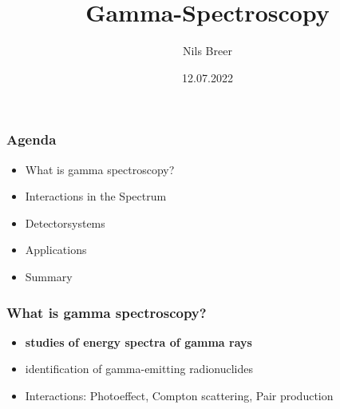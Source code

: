 \documentclass[aspectratio=1610, 12pt]{beamer}
\title{Gamma-Spectroscopy}
\author[N.Breer]{Nils Breer}
\institute{Fakultät Physik}
\date{12.07.2022}
\begin{document}
\maketitle

\begin{frame}\frametitle{Agenda}
  \begin{itemize}
    \item What is gamma spectroscopy?
    \item Interactions in the Spectrum
    \item Detectorsystems
    \item Applications
    \item Summary
  \end{itemize}
\end{frame}

\begin{frame}\frametitle{What is gamma spectroscopy?}
  \begin{itemize}
    \item \textbf{studies of energy spectra of gamma rays}
    \item identification of gamma-emitting radionuclides
    \item Interactions: Photoeffect, Compton scattering, Pair production
  \end{itemize}
\end{frame}
\end{document}
